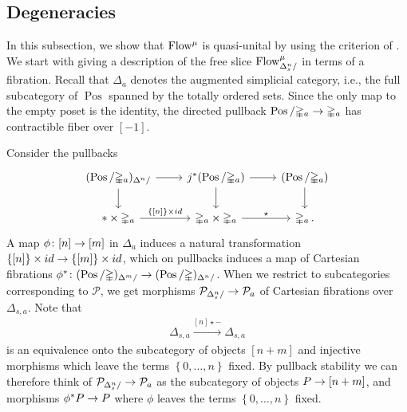 \documentclass[10pt]{amsart}
\numberwithin{equation}{section}
\theoremstyle{definition}
\DeclareMathOperator{\Pos}{Pos}
\newcommand{\PreFlow}{\mathrm{Flow}\vphantom{w}}
\newcommand{\Simp}{\mathbb{\Delta}}
\newcommand{\cP}{\mathcal{P}}
\newcommand{\join}{\star}
\renewcommand{\to}{\mathchoice{\longrightarrow}{\rightarrow}{}{}}
\begin{document}
\subsection{Degeneracies}\label{subsec:degeneracies}

In this subsection, we show that $\PreFlow^{\mu}$ is quasi-unital by using the criterion of .
We start with giving a description of the free slice $\PreFlow^{\mu}_{\Delta^{n}_{s}/}$ in terms of a fibration.
Recall that $\Simp_{a}$ denotes the augmented simplicial category, i.e., the full subcategory of $\Pos$ spanned by the totally ordered sets.
Since the only map to the empty poset is the identity, the directed pullback $\Pos/\Simp_{a} \to \Simp_{a}$ has contractible fiber over $[-1]$.

Consider the pullbacks
\begin{equation*}
	\begin{tikzcd}
		(\Pos/\Simp_{a})_{\Delta^{n}/} \arrow[r]  \arrow[d] &
		j^{*}(\Pos/\Simp_{a}) \arrow[r] \arrow[d]      &
		(\Pos/\Simp_{a})  \arrow[d] \\
		\ast \times \Simp_{a} \arrow[r, "{ \left\{ [n]\right\}\times id  }"] &
		\Simp_{a}\times \Simp_{a}  \arrow[r, "\join"]               &
		\Simp_{a} \,.
	\end{tikzcd}
\end{equation*}
A map $\phi\colon [n] \to [m]$ in $\Simp_{a}$ induces a natural transformation  $\left\{ [n]\right\}\times id \to \left\{ [m]\right\}\times id$, which on pullbacks induces a map of Cartesian fibrations $\phi^{*}\colon (\Pos/\Simp)_{\Delta^{m}/} \to (\Pos/\Simp)_{\Delta^{n}/}$.
When we restrict to subcategories corresponding to $\cP$, we get morphisms $\cP_{\Delta^{n}_{s}/} \to \cP_{a}$ of Cartesian fibrations over $\Simp_{s,a}$. Note that
\begin{align*}
	\Simp_{s,a} \xrightarrow{[n]\join-} \Simp_{s,a}
\end{align*}
is an equivalence onto the subcategory of objects $[n+m]$ and injective morphisms which leave the terms $\left\{ 0,\dots, n\right\}$ fixed.
By pullback stability we can therefore think of $\cP_{\Delta^{n}_{s}/} \to \cP_{a}$ as the subcategory of objects $P\to [n+m]$, and morphisms $\phi^{*}P \to P$ where $\phi$ leaves the terms $\left\{ 0,\dots , n\right\}$ fixed.
\end{document}

